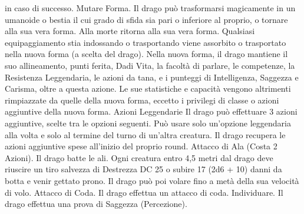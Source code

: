 \begin{multicols}{2}
in caso di successo.
Mutare Forma. Il drago può trasformarsi magicamente in un
umanoide o bestia il cui grado di sfida sia pari o inferiore al proprio,
o tornare alla sua vera forma. Alla morte ritorna alla sua vera forma.
Qualsiasi equipaggiamento stia indossando o trasportando viene
assorbito o trasportato nella nuova forma (a scelta del drago).
Nella nuova forma, il drago mantiene il suo allineamento, punti
ferita, Dadi Vita, la facoltà di parlare, le competenze, la Resistenza
Leggendaria, le azioni da tana, e i punteggi di Intelligenza, Saggezza
e Carisma, oltre a questa azione. Le sue statistiche e capacità
vengono altrimenti rimpiazzate da quelle della nuova forma, eccetto i
privilegi di classe o azioni aggiuntive della nuova forma.
Azioni Leggendarie
Il drago può effettuare 3 azioni aggiuntive, scelte tra le opzioni
seguenti. Può usare solo un’opzione leggendaria alla volta e solo
al termine del turno di un’altra creatura. Il drago recupera le
azioni aggiuntive spese all’inizio del proprio round.
Attacco di Ala (Costa 2 Azioni). Il drago batte le ali. Ogni
creatura entro 4,5 metri dal drago deve riuscire un tiro salvezza
di Destrezza DC 25 o subire 17 (2d6 + 10) danni da botta e
venir gettato prono. Il drago può poi volare fino a metà della sua
velocità di volo.
Attacco di Coda. Il drago effettua un attacco di coda.
Individuare. Il drago effettua una prova di Saggezza
(Percezione).
 

\end{multicols}
